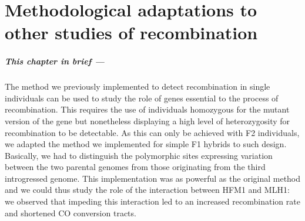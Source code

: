 \chapter{\label{ch:8-HFM1}Methodological adaptations to other studies of recombination}



\minitoc{}

{\small{} \itshape{}

\paragraph{This chapter in brief —}

The method we previously implemented to detect recombination in single individuals can be used to study the role of genes essential to the process of recombination.
This requires the use of individuals homozygous for the mutant version of the gene but nonetheless displaying a high level of heterozygosity for recombination to be detectable.
As this can only be achieved with F2 individuals,
%
we adapted the method we implemented for simple F1 hybrids to such design.
Basically, we had to distinguish the polymorphic sites expressing variation between the two parental genomes from those originating from the third introgressed genome.
This implementation was as powerful as the original method and we could thus study the role of the interaction between HFM1 and MLH1:
we observed that impeding this interaction led to an increased recombination rate and shortened CO conversion tracts.

}

